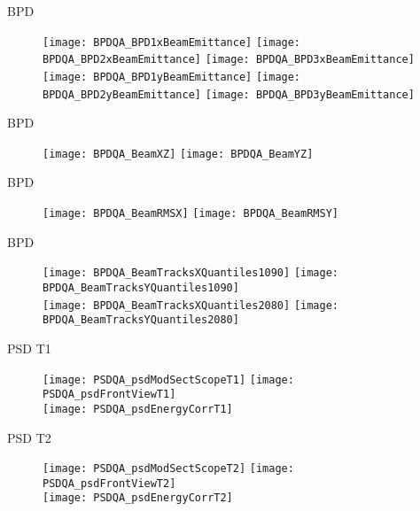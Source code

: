 \documentclass[11pt]{beamer}
\begin{document}
\begin{frame}{BPD}
\begin{figure}
\centering
\texttt{[image: BPDQA\_BPD1xBeamEmittance]}
\texttt{[image: BPDQA\_BPD2xBeamEmittance]}
\texttt{[image: BPDQA\_BPD3xBeamEmittance]} \\ 
\texttt{[image: BPDQA\_BPD1yBeamEmittance]}
\texttt{[image: BPDQA\_BPD2yBeamEmittance]}
\texttt{[image: BPDQA\_BPD3yBeamEmittance]} 
\end{figure}
\end{frame}

\begin{frame}{BPD}
\begin{figure}
\centering
\texttt{[image: BPDQA\_BeamXZ]}
\texttt{[image: BPDQA\_BeamYZ]}
\end{figure}
\end{frame}

\begin{frame}{BPD}
\begin{figure}
\centering
\texttt{[image: BPDQA\_BeamRMSX]}
\texttt{[image: BPDQA\_BeamRMSY]}
\end{figure}
\end{frame}

\begin{frame}{BPD}
\begin{figure}
\centering
\texttt{[image: BPDQA\_BeamTracksXQuantiles1090]}
\texttt{[image: BPDQA\_BeamTracksYQuantiles1090]}\\
\texttt{[image: BPDQA\_BeamTracksXQuantiles2080]}
\texttt{[image: BPDQA\_BeamTracksYQuantiles2080]}
\end{figure}
\end{frame}

\begin{frame}{PSD T1}
\begin{figure}
\centering
\texttt{[image: PSDQA\_psdModSectScopeT1]}
\texttt{[image: PSDQA\_psdFrontViewT1]} \\
\texttt{[image: PSDQA\_psdEnergyCorrT1]}
\end{figure}
\end{frame}

\begin{frame}{PSD T2}
\begin{figure}
\centering
\texttt{[image: PSDQA\_psdModSectScopeT2]}
\texttt{[image: PSDQA\_psdFrontViewT2]} \\
\texttt{[image: PSDQA\_psdEnergyCorrT2]}
\end{figure}
\end{frame}
\end{document}
